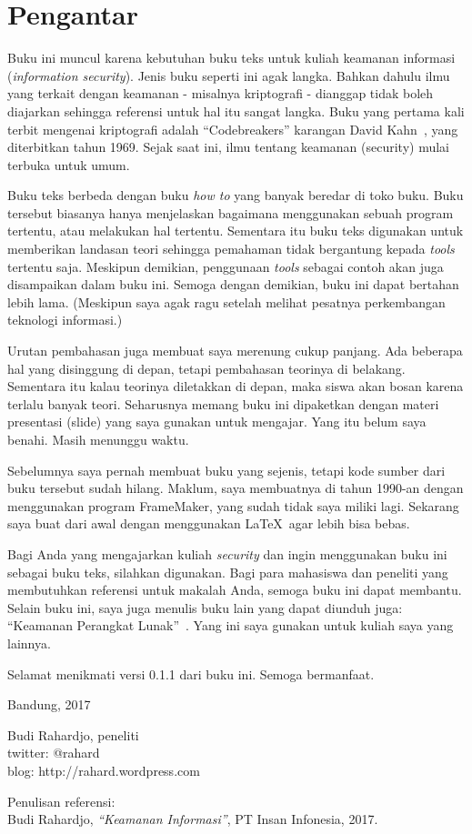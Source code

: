\chapter{Pengantar}

Buku ini muncul karena kebutuhan buku teks untuk kuliah
keamanan informasi ({\em information security}).
Jenis buku seperti ini agak langka.
Bahkan dahulu ilmu yang terkait dengan keamanan - misalnya kriptografi -
dianggap tidak boleh diajarkan sehingga referensi untuk hal itu
sangat langka.
Buku yang pertama kali terbit mengenai kriptografi adalah
``Codebreakers'' karangan David Kahn~\cite{davidkahn},
yang diterbitkan tahun 1969.
Sejak saat ini, ilmu tentang keamanan (security) mulai terbuka untuk umum.

Buku teks berbeda dengan buku {\em how to} yang banyak beredar
di toko buku. Buku tersebut biasanya hanya menjelaskan bagaimana
menggunakan sebuah program tertentu, atau melakukan hal tertentu.
Sementara itu buku teks digunakan untuk memberikan landasan teori
sehingga pemahaman tidak bergantung kepada {\em tools} tertentu saja.
Meskipun demikian, penggunaan {\em tools} sebagai contoh akan
juga disampaikan dalam buku ini.
Semoga dengan demikian, buku ini dapat bertahan lebih lama.
(Meskipun saya agak ragu setelah melihat pesatnya perkembangan
teknologi informasi.)

Urutan pembahasan juga membuat saya merenung cukup panjang.
Ada beberapa hal yang disinggung di depan, tetapi pembahasan teorinya
di belakang. Sementara itu kalau teorinya diletakkan di depan,
maka siswa akan bosan karena terlalu banyak teori.
Seharusnya memang buku ini dipaketkan dengan materi presentasi
(slide) yang saya gunakan untuk mengajar. 
Yang itu belum saya benahi. Masih menunggu waktu.

Sebelumnya saya pernah membuat buku yang sejenis, tetapi kode sumber
dari buku tersebut sudah hilang.
Maklum, saya membuatnya di tahun 1990-an dengan menggunakan program
FrameMaker, yang sudah tidak saya miliki lagi.
Sekarang saya buat dari awal dengan menggunakan \LaTeX \ agar
lebih bisa bebas.

Bagi Anda yang mengajarkan kuliah {\em security} dan ingin menggunakan
buku ini sebagai buku teks, silahkan digunakan.
Bagi para mahasiswa dan peneliti yang membutuhkan referensi untuk
makalah Anda, semoga buku ini dapat membantu.
Selain buku ini, saya juga menulis buku lain yang dapat diunduh juga:
``Keamanan Perangkat Lunak''~\cite{BRsecuresoftware}.
Yang ini saya gunakan untuk kuliah saya yang lainnya.


Selamat menikmati versi 0.1.1 dari buku ini. Semoga bermanfaat.
\vspace{5 mm}

Bandung, 2017


Budi Rahardjo, peneliti\\
twitter: @rahard\\
blog: http://rahard.wordpress.com

\vspace{5 mm}
Penulisan referensi:\\
Budi Rahardjo, {\em ``Keamanan Informasi''}, PT Insan Infonesia, 2017.

\doclicenseThis

